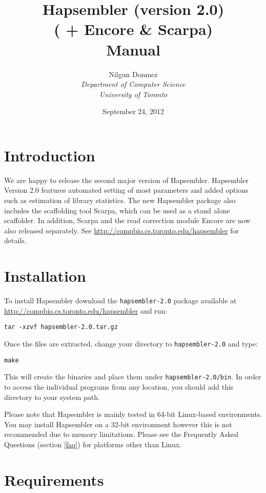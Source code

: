 \documentclass[12pt,a4paper]{report}
\title{Hapsembler (version 2.0) \\ ( + Encore \& Scarpa) \\ Manual }
\author{Nilgun Donmez \\
\emph{Department of Computer Science} \\
\emph{University of Toronto} }
\date{September 24, 2012}
\begin{document}
\maketitle
\tableofcontents
\newpage

\renewcommand*\thesection{\arabic{section}}

\section{Introduction}

We are happy to release the second major version of Hapsembler. Hapsembler Version 2.0 features automated setting of most parameters and added options such as estimation of library statistics. The new Hapsembler package also includes the scaffolding tool Scarpa, which can be used as a stand alone scaffolder. In addition, Scarpa and the read correction module Encore are now also released separately. See \url{http://compbio.cs.toronto.edu/hapsembler} for details. 

\section{Installation}

To install Hapsembler download the \texttt{hapsembler-2.0} package available at \\ \url{http://compbio.cs.toronto.edu/hapsembler} and run:

\begin{verbatim}
tar -xzvf hapsembler-2.0.tar.gz
\end{verbatim}

Once the files are extracted, change your directory to \texttt{hapsembler-2.0} and type:

\begin{verbatim}
make
\end{verbatim}

This will create the binaries and place them under \texttt{hapsembler-2.0/bin}. In order to access the individual programs from any location, you should add this directory to your system path. 

Please note that Hapsembler is mainly tested in 64-bit Linux-based environments. You may install Hapsembler on a 32-bit environment however this is not recommended due to memory limitations. Please see the Frequently Asked Questions (section \ref{faq}) for platforms other than Linux.

\section{Requirements}
\end{document}
